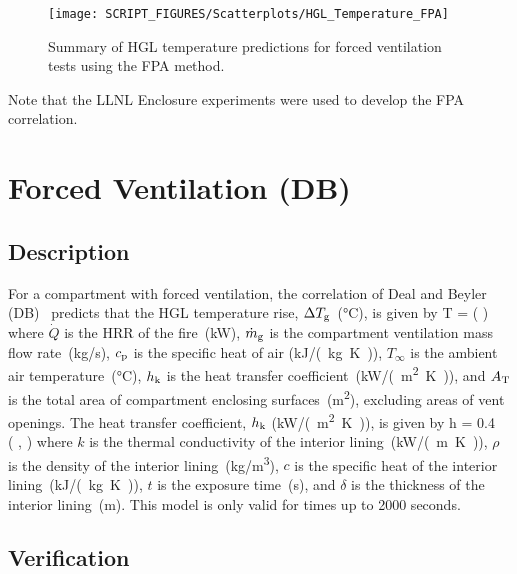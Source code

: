 \begin{figure}[!ht]
\begin{center}
\texttt{[image: SCRIPT\_FIGURES/Scatterplots/HGL\_Temperature\_FPA]}
\end{center}
\caption[Summary of HGL temperature predictions for forced ventilation tests (FPA)]
{Summary of HGL temperature predictions for forced ventilation tests using the FPA method.}
\label{HGL_Summary_Forced_Ventilation_FPA}
\end{figure}

Note that the LLNL Enclosure experiments were used to develop the FPA correlation.


\clearpage


\section{Forced Ventilation (DB)}
\label{sec:DB}

\subsection*{Description}

For a compartment with forced ventilation, the correlation of Deal and Beyler (DB)~\cite{SFPE:Walton} predicts that the HGL temperature rise, $\Delta T\sb{g}$~(\si{\celsius}), is given by
\be
\Delta T = \left(  \right)
\label{eq:DB}
\ee
where $\dot Q$ is the HRR of the fire~(\si{kW}), $\dot m\sb{g}$ is the compartment ventilation mass flow rate~(\si{kg/s}), $c\sb{p}$ is the specific heat of air (\si{kJ/(kg.K)}), $T_\infty$ is the ambient air temperature~(\si{\celsius}), $h\sb{k}$ is the heat transfer coefficient~(\si{kW/(m^2.K)}), and $A\sb{T}$ is the total area of compartment enclosing surfaces~(\si{m^2}), excluding areas of vent openings. The heat transfer coefficient, $h\sb{k}$ (\si{kW/(m^2.K)}), is given by
\be
h = 0.4\  \left(  ,  \right)
\label{eq:DB_hk}
\ee
where $k$ is the thermal conductivity of the interior lining~(\si{kW/(m.K)}), $\rho$ is the density of the interior lining~(\si{kg/m^3}), $c$ is the specific heat of the interior lining~(\si{kJ/(kg.K)}), $t$ is the exposure time~(\si{\second}), and $\delta$ is the thickness of the interior lining~(\si{m}). This model is only valid for times up to 2000 seconds.


\clearpage


\subsection*{Verification}

